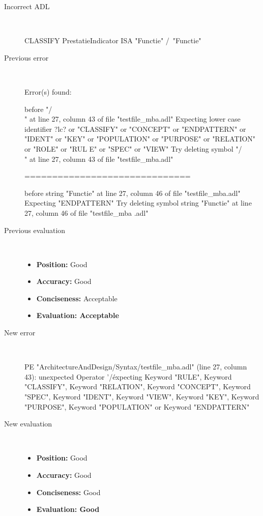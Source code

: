 \begin{description}
  \item[Incorrect ADL]~\\
\begin{adl}
CLASSIFY PrestatieIndicator ISA "Functie" /\ "Functie"\end{adl}
  \item[Previous error]~\\
\begin{haskell}
Error(s) found:

before "/\\" at line 27, column 43 of file "testfile_mba.adl"
Expecting lower case identifier ?lc? or "CLASSIFY" or "CONCEPT" or "ENDPATTERN"
or "IDENT" or "KEY" or "POPULATION" or "PURPOSE" or "RELATION" or "ROLE" or "RUL
E" or "SPEC" or "VIEW"
Try deleting symbol "/\\" at line 27, column 43 of file "testfile_mba.adl"

==============================

before string "Functie" at line 27, column 46 of file "testfile_mba.adl"
Expecting "ENDPATTERN"
Try deleting symbol string "Functie" at line 27, column 46 of file "testfile_mba
.adl"

\end{haskell}
  \item[Previous evaluation]~\\
    \begin{itemize}
    \item \textbf{Position:} Good
    \item \textbf{Accuracy:} Good
    \item \textbf{Conciseness:} Acceptable
    \item \textbf{Evaluation: Acceptable}
    \end{itemize}
  \item[New error]~\\
\begin{haskell}
PE "ArchitectureAndDesign/Syntax/testfile_mba.adl" (line 27, column 43):
unexpected Operator '/\'
expecting Keyword "RULE", Keyword "CLASSIFY", Keyword "RELATION", Keyword "CONCEPT", Keyword "SPEC", Keyword "IDENT", Keyword "VIEW", Keyword "KEY", Keyword "PURPOSE", Keyword "POPULATION" or Keyword "ENDPATTERN"
\end{haskell}
  \item[New evaluation]~\\
    \begin{itemize}
    \item \textbf{Position:} Good
    \item \textbf{Accuracy:} Good
    \item \textbf{Conciseness:} Good
    \item \textbf{Evaluation: Good}
    \end{itemize}
  \end{description}

